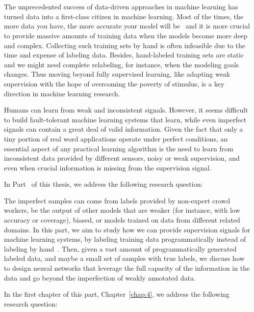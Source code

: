 \part{} %
\label{part2}
The unprecedented success of data-driven approaches in machine learning has turned data into a first-class citizen in machine learning. Most of the times, the more data you have, the more accurate your model will be~\citep{halevy2009unreasonable,sun2017revisiting} and it is more crucial to provide massive amounts of training data when the models become more deep and complex.
Collecting such training sets by hand is often infeasible due to the time and expense of labeling data. Besides, hand-labeled training sets are static and we might need complete relabeling, for instance, when the modeling goals changes. Thus moving beyond fully supervised learning, like adapting weak supervision with the hope of overcoming the poverty of stimulus, is a key direction in machine learning research.

Humans can learn from weak and inconsistent signals\citep{chomsky1980rules}. However, it seems difficult to build fault-tolerant machine learning systems that learn, while even imperfect signals can contain a great deal of valid information.
Given the fact that only a tiny portion of real word applications operate under perfect conditions, an essential aspect of any practical learning algorithm is the need to learn from inconsistent data provided by different sensors, noisy or weak supervision, and even when crucial information is missing from the supervision signal.

In Part~\ref{part2} of this thesis, we address the following research question:

The imperfect samples can come from labels provided by non-expert crowd workers, be the output of other models that are weaker (for instance, with low accuracy or coverage), biased, or models trained on data from different related domains. 
In this part, we aim to study how we can provide supervision signals for machine learning systems, by labeling training data programmatically instead of labeling by hand~\citep{Ratner:2016}. Then, given a vast amount of programmatically generated labeled data, and maybe a small set of samples with true labels,  we discuss how to design neural networks that leverage the full capacity of the information in the data and go beyond the imperfection of weakly annotated data.


In the first chapter of this part, Chapter~\ref{chap:4}, we address the following research question:

